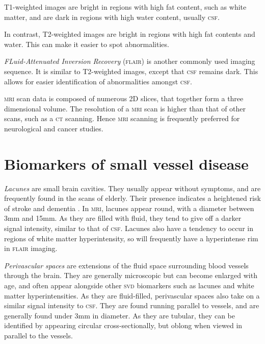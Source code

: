 T1-weighted images are bright in regions with high fat content, such as white matter, and are dark in regions with high water content, usually \textsc{csf}.

In contrast, T2-weighted images are bright in regions with high fat contents and water. This can make it easier to spot abnormalities.

\textit{FLuid-Attenuated Inversion Recovery} (\textsc{flair}) is another commonly used imaging sequence. It is similar to T2-weighted images, except that \textsc{csf} remains dark. This allows for easier identification of abnormalities amongst \textsc{csf}.


\textsc{mri} scan data is composed of numerous 2D slices, that together form a three dimensional volume. The resolution of a \textsc{mri} scan is higher than that of other scans, such as a \textsc{ct} scanning. Hence \textsc{mri} scanning is frequently preferred for neurological and cancer studies.

\section{Biomarkers of small vessel disease}\label{svd-markers}

\textit{Lacunes} are small brain cavities. They usually appear without symptoms, and are frequently found in the scans of elderly. Their presence indicates a heightened risk of stroke and dementia \cite{VanDerFlierM.Wiesje2005SVDa, BenjaminJ.Philip2018LIbN}. In \textsc{mri}, lacunes appear round, with a diameter between 3mm and 15mm. As they are filled with fluid, they tend to give off a darker signal intensity, similar to that of \textsc{csf}. Lacunes also have a tendency to occur in regions of white matter hyperintensity, so will frequently have a hyperintense rim in \textsc{flair} imaging.

\textit{Perivascular spaces} are extensions of the fluid space surrounding blood vessels through the brain. They are generally microscopic but can become enlarged with age, and often appear alongside other \textsc{svd} biomarkers such as lacunes and white matter hyperintensities. As they are fluid-filled, perivascular spaces also take on a similar signal intensity to \textsc{csf}. They are found running parallel to vessels, and are generally found under 3mm in diameter. As they are tubular, they can be identified by appearing circular cross-sectionally, but oblong when viewed in parallel to the vessels.

